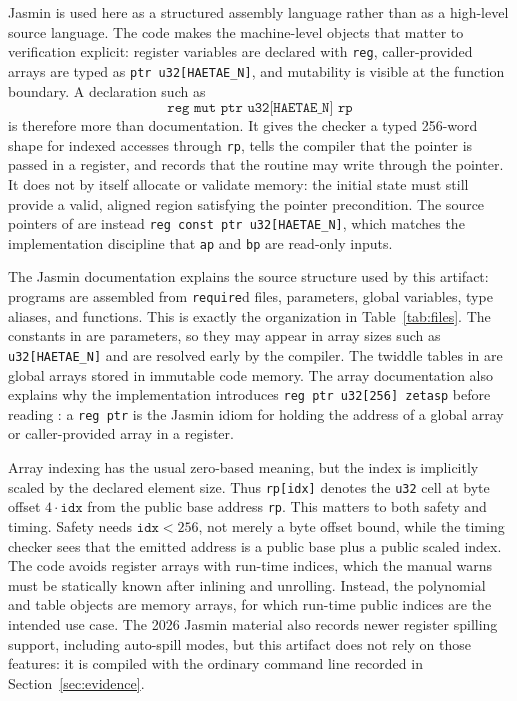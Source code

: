 \documentclass[10pt,twocolumn]{article}
\newcommand{\jasmin}{Jasmin}
\begin{document}
\jasmin{} is used here as a structured assembly language rather than as a
high-level source language.  The code makes the machine-level objects that
matter to verification explicit: register variables are declared with
\texttt{reg}, caller-provided arrays are typed as \texttt{ptr u32[HAETAE\_N]},
and mutability is visible at the function boundary.  A declaration such as
\[
  \texttt{reg mut ptr u32[HAETAE\_N] rp}
\]
is therefore more than documentation.  It gives the checker a typed 256-word
shape for indexed accesses through \texttt{rp}, tells the compiler that the
pointer is passed in a register, and records that the routine may write through
the pointer.  It does not by itself allocate or validate memory: the initial
state must still provide a valid, aligned region satisfying the pointer
precondition.  The source pointers of  are instead
\texttt{reg const ptr u32[HAETAE\_N]}, which matches the implementation
discipline that \texttt{ap} and \texttt{bp} are read-only inputs.

The \jasmin{} documentation explains the source structure used by this artifact:
programs are assembled from \texttt{require}d files, parameters, global
variables, type aliases, and functions.  This is exactly the organization in
Table~\ref{tab:files}.  The constants in  are parameters, so
they may appear in array sizes such as \texttt{u32[HAETAE\_N]} and are resolved
early by the compiler.  The twiddle tables in  are global
arrays stored in immutable code memory.  The array documentation also explains
why the implementation introduces \texttt{reg ptr u32[256] zetasp} before
reading : a \texttt{reg ptr} is the Jasmin idiom for holding the
address of a global array or caller-provided array in a register.

Array indexing has the usual zero-based meaning, but the index is implicitly
scaled by the declared element size.  Thus \texttt{rp[idx]} denotes the
\texttt{u32} cell at byte offset \(4\cdot\texttt{idx}\) from the public base
address \texttt{rp}.  This matters to both safety and timing.  Safety needs
\(\texttt{idx}<256\), not merely a byte offset bound, while the timing checker
sees that the emitted address is a public base plus a public scaled index.  The
code avoids register arrays with run-time indices, which the manual warns must
be statically known after inlining and unrolling.  Instead, the polynomial and
table objects are memory arrays, for which run-time public indices are the
intended use case.  The 2026 \jasmin{} material also records newer register
spilling support, including auto-spill modes, but this artifact does not rely on
those features: it is compiled with the ordinary command line recorded in
Section~\ref{sec:evidence}.
\end{document}
